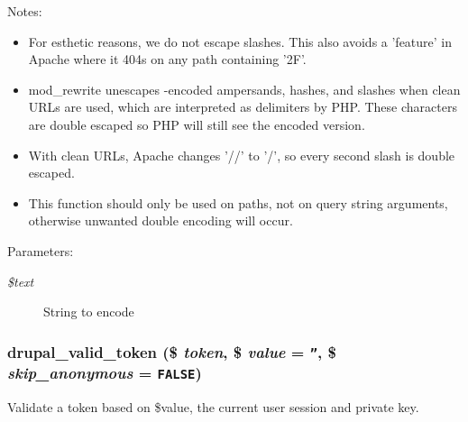 Notes:\begin{itemize}
\item For esthetic reasons, we do not escape slashes. This also avoids a 'feature' in Apache where it 404s on any path containing '2F'.\item mod\_\-rewrite unescapes -encoded ampersands, hashes, and slashes when clean URLs are used, which are interpreted as delimiters by PHP. These characters are double escaped so PHP will still see the encoded version.\item With clean URLs, Apache changes '//' to '/', so every second slash is double escaped.\item This function should only be used on paths, not on query string arguments, otherwise unwanted double encoding will occur.\end{itemize}


\begin{Desc}
\item[Parameters:]
\begin{description}
\item[{\em \$text}]String to encode \end{description}
\end{Desc}
\hypertarget{common_8inc_343a6ad44cfc1007b618b245f9366be8}{
\subsubsection[{drupal\_\-valid\_\-token}]{\setlength{\rightskip}{0pt plus 5cm}drupal\_\-valid\_\-token (\$ {\em token}, \/  \$ {\em value} = {\tt ''}, \/  \$ {\em skip\_\-anonymous} = {\tt FALSE})}}
\label{common_8inc_343a6ad44cfc1007b618b245f9366be8}


Validate a token based on \$value, the current user session and private key.


